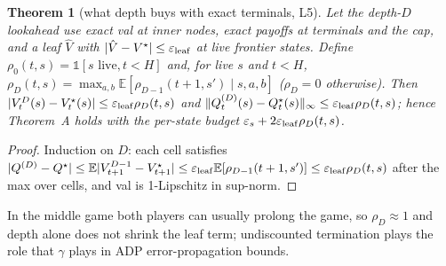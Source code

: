 \documentclass[10pt]{article}
\theoremstyle{plain}
\newtheorem{theorem}{Theorem}
\theoremstyle{definition}
\theoremstyle{remark}
\newcommand{\E}{\mathbb{E}}
\newcommand{\epss}{\varepsilon_s}
\begin{document}
\begin{theorem}[what depth buys with exact terminals, L5]\label{thm:L5}
Let the depth-$D$ lookahead use exact val at inner nodes, exact payoffs at terminals and the cap, and a leaf $\hat V$ with $|\hat V-V^\star|\le\varepsilon_{\rm leaf}$ at live frontier states. Define $\rho_0(t,s)=\mathbb 1[s\text{ live},t<H]$ and, for live $s$ and $t<H$, $\rho_D(t,s)=\max_{a,b}\E[\rho_{D-1}(t+1,s')\mid s,a,b]$ ($\rho_D=0$ otherwise). Then $|V^D_t(s)-V^\star_t(s)|\le\varepsilon_{\rm leaf}\rho_D(t,s)$ and $\lVert Q^{(D)}_t(s)-Q^\star_t(s)\rVert_\infty\le\varepsilon_{\rm leaf}\rho_D(t,s)$; hence Theorem~A holds with the per-state budget $\epss+2\varepsilon_{\rm leaf}\rho_D(t,s)$.
\end{theorem}
\begin{proof}
Induction on $D$: each cell satisfies $|Q^{(D)}-Q^\star|\le\E|V^{D-1}_{t+1}-V^\star_{t+1}|\le\varepsilon_{\rm leaf}\E[\rho_{D-1}(t+1,s')]\le\varepsilon_{\rm leaf}\rho_D(t,s)$ after the max over cells, and val is 1-Lipschitz in sup-norm.
\end{proof}
In the middle game both players can usually prolong the game, so $\rho_D\approx1$ and depth alone does not shrink the leaf term; undiscounted termination plays the role that $\gamma$ plays in ADP error-propagation bounds.
\end{document}
